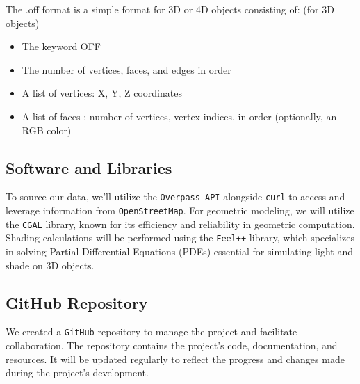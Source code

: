 \documentclass[12pt]{article}
\begin{document}
The .off format\cite{off_format} is a simple format for 3D or 4D objects consisting of: (for 3D objects)
\begin{itemize}
    \item The keyword OFF
    \item The number of vertices, faces, and edges in order 
    \item A list of vertices: X, Y, Z coordinates
    \item A list of faces : number of vertices, vertex indices, in order (optionally, an RGB color)
\end{itemize}

\subsection{Software and Libraries}
To source our data, we'll utilize the \texttt{Overpass API} \cite{overpass} alongside
\texttt{curl} \cite{curl} to access and leverage information from \texttt{OpenStreetMap}.
For geometric modeling, we will utilize the \texttt{CGAL} \cite{cgal} library, known for its efficiency and 
reliability in geometric computation. Shading calculations will be performed using the 
\texttt{Feel++} \cite{feel++} library, which specializes in solving Partial Differential Equations (PDEs) 
essential for simulating light and shade on 3D objects.

\subsection{GitHub Repository}
We created a \texttt{GitHub} repository to manage the project and facilitate collaboration.
The repository contains the project's code, documentation, and resources. It will be
updated regularly to reflect the progress and changes made during the project's
development.
\end{document}
